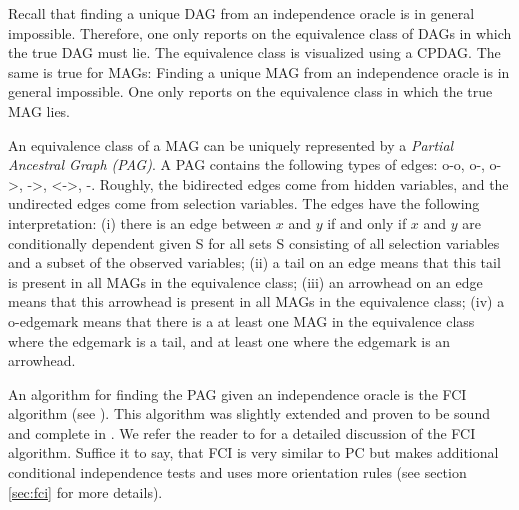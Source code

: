 \documentclass[article]{jss}
\begin{document}
Recall that finding a unique DAG from an independence oracle is in general
impossible. Therefore, one only reports on the equivalence class of DAGs in
which the true DAG must lie. The equivalence class is visualized using a
CPDAG. The same is true for MAGs: Finding a unique MAG from an independence
oracle is in general impossible. One only reports on the equivalence class
in which the true MAG lies. 

An equivalence class of a MAG can be uniquely represented by a
\emph{Partial Ancestral Graph (PAG)}. A PAG contains the following
types of edges: o-o, o-, o->, ->, <->, -. Roughly, the bidirected edges come
from hidden variables, and the undirected edges come from selection
variables. The edges have the following interpretation: (i) there is
an edge between $x$ and $y$ if and only if $x$ and $y$ are
conditionally dependent given S for all sets S consisting of all
selection variables and a subset of the observed variables; (ii) a
tail on an edge means that this tail is present in all MAGs in the
equivalence class; (iii) an arrowhead on an edge means that this
arrowhead is present in all MAGs in the equivalence class; (iv) a
o-edgemark means that there is a at least one MAG in the equivalence
class where the edgemark is a tail, and at least one where the
edgemark is an arrowhead.

An algorithm for finding the PAG given an independence oracle is the FCI
algorithm (see \cite{SpirtesEtAl00}). This algorithm was slightly extended and proven to be
sound and complete in \cite{Zhang08-orientation-rules}. We refer the reader
to \cite{Zhang08-orientation-rules} for a detailed discussion of the FCI algorithm. Suffice it to say,
that FCI is very similar to PC but makes additional conditional
independence tests and uses more orientation rules (see section
\ref{sec:fci} for more details).
\end{document}
